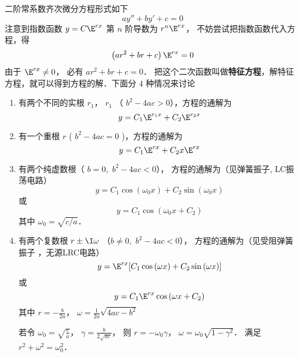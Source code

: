 二阶常系数齐次微分方程形式如下
\begin{equation}
ay'' + by' + c = 0
\end{equation}
注意到指数函数 $y = C{\E^{rx}}$ 第 $n$ 阶导数为 ${r^n}{\E^{rx}}$， 不妨尝试把指数函数代入方程，得
\begin{equation}
\left( {a{r^2} + br + c} \right){\E^{rx}} = 0
\end{equation}
由于 ${\E^{rx}} \ne 0$， 必有 $a{r^2} + br + c = 0$． 把这个二次函数叫做\textbf{特征方程}，解特征方程，就可以得到方程的解．下面分 $4$ 种情况来讨论

\begin{enumerate}
\item 有两个不同的实根 ${r_1}$，  ${r_1}$ （ ${b^2} - 4ac > 0$），方程的通解为
 \begin{equation}
y = {C_1}{\E^{{r_1}x}} + {C_2}{\E^{{r_2}x}}
\end{equation}
\item 有一个重根 $r$ ( ${b^2} - 4ac = 0$ )，方程的通解为
 \begin{equation}
y = {C_1}{\E^{rx}} + {C_2}x{\E^{rx}}
\end{equation}
\item 有两个纯虚数根（ ${b = 0,\,\,{b^2} - 4ac < 0}$）， 方程的通解为（见弹簧振子,%
 LC振荡电路）
\begin{equation}
y = {C_1}\cos \left( {{\omega _0}x} \right) + {C_2}\sin \left( {{\omega _0}x} \right)
\end{equation}
或 
\begin{equation}
y = {C_1}\cos \left( {{\omega _0}x + {C_2}} \right)
\end{equation} 
其中 ${\omega _0} = \sqrt {{c}/{a}}$． 

\item 有两个复数根 $r \pm \I\omega $ （${b \ne 0,\,\,{b^2} - 4ac < 0}$）， 方程的通解为（见受阻弹簧振子%
，无源LRC电路）%
\begin{equation}
y = {\E^{rx}}[ {{C_1}\cos \left( {\omega x} \right) + {C_2}\sin \left( {\omega x} \right)} ]
\end{equation} 
或 
\begin{equation}
y = {C_1}{\E^{rx}}\cos \left( {\omega x + {C_2}} \right)
\end{equation} 
其中 $r =  - \frac{b}{{2a}}$，  $\omega  = \frac{1}{{2a}}\sqrt {4ac - {b^2}} $

若令 ${\omega _0} = \sqrt {\frac{c}{a}} $，  $\gamma  = \frac{b}{{2\sqrt {ac} }}$，  则 $r =  - {\omega _0}\gamma $，  $\omega  = {\omega _0}\sqrt {1 - {\gamma ^2}} $． 满足 ${r^2} + {\omega ^2} = \omega _0^2$． 
\end{enumerate}


















 
